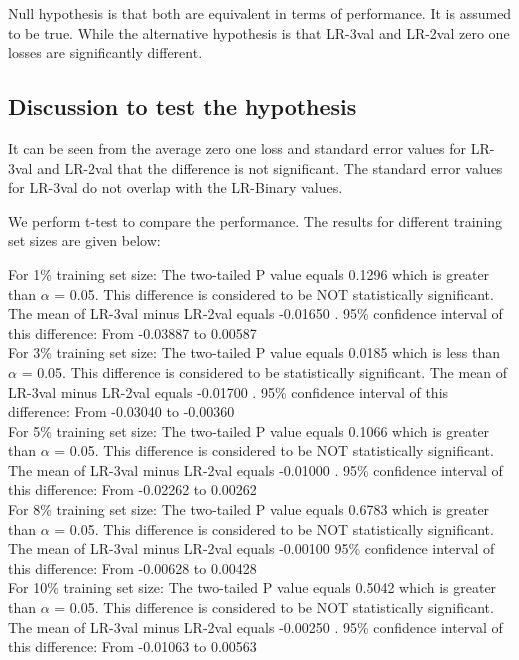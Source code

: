 \documentclass[12pt]{article}
\begin{document}
Null hypothesis is that both are equivalent in terms of performance. It is assumed
to be true. While the alternative hypothesis is that LR-3val and LR-2val zero one losses 
are significantly different.


\subsection{Discussion to test the hypothesis}

It can be seen from the average zero one loss and standard error values for LR-3val and LR-2val
that the difference is not significant. The standard error values for LR-3val do not overlap with the
LR-Binary values.

We perform t-test to compare the performance. The results for different training set sizes are given below:

For 1\% training set size:
  The two-tailed P value equals 0.1296  which is greater than $\alpha$ = 0.05.
  This difference is considered to be NOT statistically significant. 
  The mean of LR-3val minus LR-2val equals  -0.01650 .
  95\% confidence interval of this difference: From -0.03887 to 0.00587  \\

For 3\% training set size:
  The two-tailed P value equals 0.0185  which is less than $\alpha$ = 0.05.
  This difference is considered to be statistically significant. 
  The mean of LR-3val minus LR-2val  equals -0.01700 .
  95\% confidence interval of this difference: From -0.03040 to -0.00360  \\

For 5\% training set size:
  The two-tailed P value equals 0.1066  which is greater than $\alpha$ = 0.05.
  This difference is considered to be NOT statistically significant. 
  The mean of  LR-3val minus LR-2val  equals   -0.01000 .
  95\% confidence interval of this difference: From -0.02262 to 0.00262   \\

For 8\% training set size:
  The two-tailed P value equals 0.6783   which is greater than $\alpha$ = 0.05.
  This difference is considered to be NOT statistically significant. 
  The mean of LR-3val minus LR-2val  equals  -0.00100 
  95\% confidence interval of this difference: From -0.00628 to 0.00428 \\

For 10\% training set size:
  The two-tailed P value equals 0.5042  which is greater than $\alpha$ = 0.05.
  This difference is considered to be NOT statistically significant. 
  The mean of  LR-3val minus LR-2val  equals  -0.00250 . 
  95\% confidence interval of this difference: From -0.01063 to 0.00563  \\
\end{document}
